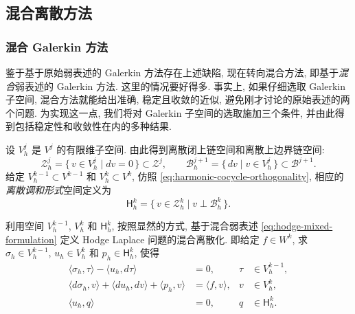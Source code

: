 \subsection{{混合离散方法}}\label{sec:mixed-methods}

\subsubsection{{混合 Galerkin 方法}}\label{subsec:mixed-galerkin}

{鉴于基于原始弱表述的 Galerkin 方法存在上述缺陷, 现在转向混合方法, 即基于\emph{混合}弱表述的 Galerkin 方法. 这里的情况要好得多. 事实上, 如果仔细选取 Galerkin 子空间, 混合方法就能给出准确, 稳定且收敛的近似, 避免刚才讨论的原始表述的两个问题. 为实现这一点, 我们将对 Galerkin 子空间的选取施加三个条件, 并由此得到包括稳定性和收敛性在内的多种结果.}

{设 $V_h^j$ 是 $V^j$ 的有限维子空间. 由此得到离散闭上链空间和离散上边界链空间:}
\[
\mathcal Z_h^j=\{\,v\in V_h^j\mid dv=0\,\}\subset\mathcal Z^j,\qquad\mathcal B_h^{j+1}=\{\,dv\mid v\in V_h^j\,\}\subset\mathcal B^{j+1}.
\]
{给定 $V_h^{k-1}\subset V^{k-1}$ 和 $V_h^k\subset V^k$, 仿照 \eqref{eq:harmonic-cocycle-orthogonality}, 相应的\emph{离散调和形式}空间定义为}
\[
\mathsf H_h^k=\{\,v\in\mathcal Z_h^k\mid v\perp\mathcal B_h^k\,\}.
\]

{利用空间 $V_h^{k-1}$, $V_h^k$ 和 $\mathsf H_h^k$, 按照显然的方式, 基于混合弱表述 \eqref{eq:hodge-mixed-formulation} 定义 Hodge Laplace 问题的混合离散化. 即给定 $f\in W^k$, 求 $\sigma_h\in V_h^{k-1}$, $u_h\in V_h^k$ 和 $p_h\in\mathsf H_h^k$, 使得}
\begin{equation}\label{eq:mixed-discrete-formulation}
\begin{aligned}
\langle\sigma_h,\tau\rangle-\langle u_h,d\tau\rangle&=0,&\tau&\in V_h^{k-1},\\
\langle d\sigma_h,v\rangle+\langle du_h,dv\rangle+\langle p_h,v\rangle&=\langle f,v\rangle,&v&\in V_h^k,\\
\langle u_h,q\rangle&=0,&q&\in\mathsf H_h^k.
\end{aligned}
\end{equation}

